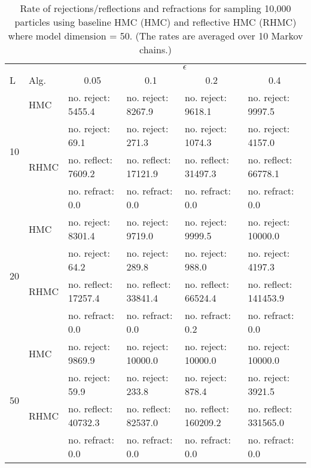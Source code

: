 \documentclass{article} %
\begin{document}
\begin {table}
\caption {Rate of rejections/reflections and refractions for sampling 10,000 particles using baseline HMC (HMC) and reflective HMC (RHMC) where model dimension = 50.
(The rates are averaged over 10 Markov chains.)   } \label{tab3} 
\center
\begin{tabular}{llllll} 
\hline 
 & &\multicolumn{4}{c}{$\epsilon$} \\ 
\cline{3-6} L & Alg.& \multicolumn{1}{c}{0.05} & \multicolumn{1}{c}{0.1} & \multicolumn{1}{c}{0.2} & \multicolumn{1}{c}{0.4}\\ 
\hline 
%
\multirow{4}{*}{10}& HMC &  no. reject: 5455.4& no. reject: 8267.9 & no. reject: 9618.1& no. reject: 9997.5\vspace{3pt}\\
%
& \multirow{3}{*}{RHMC}& no. reject: 69.1& no. reject: 271.3& no. reject: 1074.3& no. reject: 4157.0\\ 
& &        no. reflect: 7609.2& no. reflect: 17121.9& no. reflect: 31497.3& no. reflect: 66778.1\\ 
& &          no. refract: 0.0& no. refract: 0.0& no. refract: 0.0& no. refract: 0.0\vspace{12pt}\\ 
\multirow{4}{*}{20}& HMC &  no. reject: 8301.4& no. reject: 9719.0 & no. reject: 9999.5& no. reject: 10000.0\vspace{3pt}\\
%
& \multirow{3}{*}{RHMC}& no. reject: 64.2& no. reject: 289.8& no. reject: 988.0& no. reject: 4197.3\\ 
& &        no. reflect: 17257.4& no. reflect: 33841.4& no. reflect: 66524.4& no. reflect: 141453.9\\ 
& &          no. refract: 0.0& no. refract: 0.0& no. refract: 0.2& no. refract: 0.0\vspace{12pt}\\ 
\multirow{4}{*}{50}& HMC &  no. reject: 9869.9& no. reject: 10000.0 & no. reject: 10000.0& no. reject: 10000.0\vspace{3pt}\\
%
& \multirow{3}{*}{RHMC}& no. reject: 59.9& no. reject: 233.8& no. reject: 878.4& no. reject: 3921.5\\ 
& &        no. reflect: 40732.3& no. reflect: 82537.0& no. reflect: 160209.2& no. reflect: 331565.0\\ 
& &          no. refract: 0.0& no. refract: 0.0& no. refract: 0.0& no. refract: 0.0\vspace{12pt}\\ 

\end{tabular}
\end{table}
\end{document}

